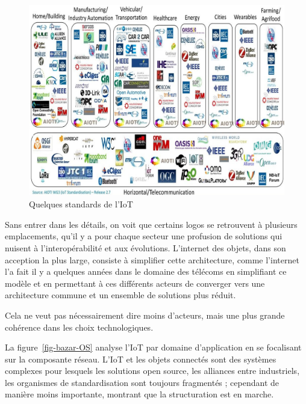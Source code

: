 \begin{figure}[tbp]
\centerline{\includegraphics[width=1\columnwidth]{Pictures/IOTBazar_Domaines.jpeg}}
\caption{Quelques standards de l'IoT}
\label{fig-bazar}
\end{figure}

Sans entrer dans les détails, on voit que certains logos se retrouvent à plusieurs emplacements, qu’il y a pour chaque secteur une profusion de solutions qui nuisent à l’interopérabilité et aux évolutions. L’internet des objets, dans son acception la plus large, consiste à simplifier cette architecture, comme l’internet l'a fait il y a quelques années dans le domaine des télécoms en simplifiant ce modèle et en permettant à ces différents acteurs de converger vers une architecture commune et un ensemble de solutions plus réduit.

Cela ne veut pas nécessairement dire moins d’acteurs, mais une plus grande cohérence dans les choix technologiques.

La figure~\vref{fig-bazar-OS} analyse l’IoT par domaine d’application en se focalisant sur la composante réseau. L’IoT et les objets connectés sont des systèmes complexes pour lesquels les solutions open source, les alliances entre industriels, les organismes de standardisation sont toujours fragmentés ; cependant de manière moins importante, montrant que la structuration est en marche.

